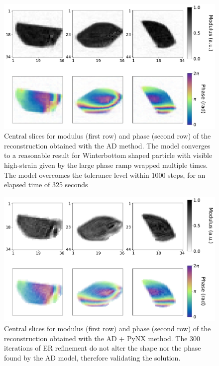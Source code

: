 \begin{figure}[H]
  \centering
  \includegraphics[width=\textwidth]{figures/AD/ad_michael.pdf}
  \caption{Central slices for modulus (first row) and phase (second row) of the reconstruction obtained with the AD method.
  The model converges to a reasonable result for Winterbottom shaped particle with visible high-strain given by the 
  large phase ramp wrapped multiple times. The model overcomes the tolerance level within 1000 steps, for an elapsed time 
  of 325 seconds }

  \label{fig:ad_michael}
\end{figure}

\begin{figure}[H]
  \centering
  \includegraphics[width=\textwidth]{figures/AD/ad_pynx_michael.pdf}
  \caption{Central slices for modulus (first row) and phase (second row) of the reconstruction obtained with the AD 
  + PyNX method. The 300 iterations of ER refinement do not alter the shape nor the phase found by the AD model, 
  therefore validating the solution.}
  \label{fig:adpynx_michael}
\end{figure}

